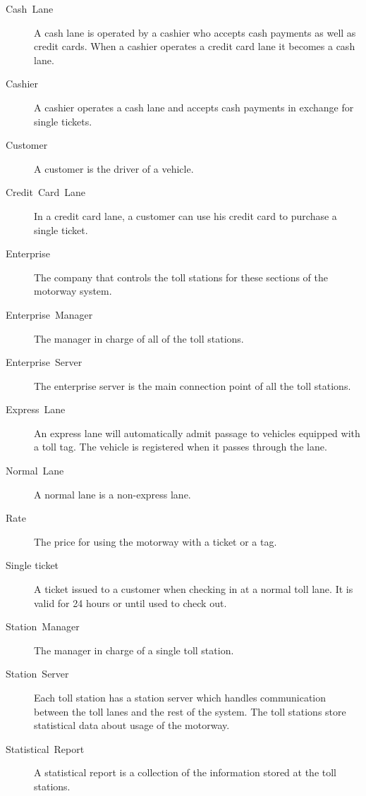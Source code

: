 \begin{description}
\item [{Cash~Lane}] A cash lane is operated by a cashier who accepts cash
payments as well as credit cards. When a cashier operates a credit card
lane it becomes a cash lane.

\item [{Cashier}] A cashier operates a cash lane and accepts cash payments
in exchange for single tickets.

\item [{Customer}] A customer is the driver of a vehicle.

\item [{Credit~Card~Lane}] In a credit card lane, a customer can use his
credit card to purchase a single ticket.

\item [{Enterprise}] The company that controls the toll stations for these sections of the motorway system.

\item [{Enterprise~Manager}] The manager in charge of all of the toll stations.

\item [{Enterprise~Server}] The enterprise server is the main connection point of all the toll stations.

\item [{Express~Lane}] An express lane will automatically admit passage
to vehicles equipped with a toll tag. The vehicle is registered
when it passes through the lane.

\item [{Normal~Lane}] A normal lane is a non-express lane.

\item [{Rate}] The price for using the motorway with a ticket or a tag. 

\item [{Single ticket}] A ticket issued to a customer when checking in at a normal toll lane. It is valid for 24 hours or until used to check out.

\item [{Station~Manager}] The manager in charge of a single toll station.

\item [{Station~Server}] Each toll station has a station server which handles communication between the toll lanes and the rest of the system. The toll stations store statistical data about usage of the motorway.

\item [{Statistical~Report}] A statistical report is a collection of the information
stored at the toll stations.



\end{description}
